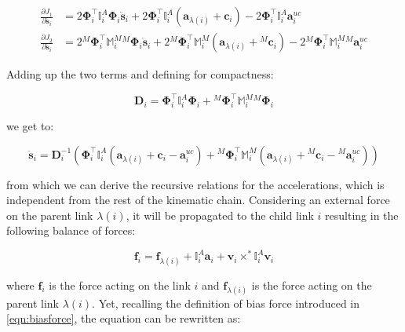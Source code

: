 \begin{align}
    \frac{\partial J _1}{\partial \ddot{\mathbf{s}} _i} & = 2 \boldsymbol{\Phi} ^\top _i \mathbb{I} ^A _i \boldsymbol{\Phi} _i \ddot{\mathbf{s}} _i + 2 \boldsymbol{\Phi} ^\top _i \mathbb{I} ^A _i (\mathbf{a} _{\lambda (i)} + \mathbf{c} _i) - 2 \boldsymbol{\Phi} ^\top _i \mathbb{I} ^A _i \mathbf{a} ^{uc} _i \nonumber                                        \\
    \frac{\partial J _2}{\partial \ddot{\mathbf{s}} _i} & = 2 {} ^M \boldsymbol{\Phi} ^\top _i \mathbb{M} ^M _i {} ^M \boldsymbol{\Phi} _i \ddot{\mathbf{s}} _i + 2 {} ^M  \boldsymbol{\Phi} ^\top _i \mathbb{M} ^M _i (\mathbf{a} _{\lambda (i)} + {} ^M  \mathbf{c} _i) - 2 {} ^M \boldsymbol{\Phi} ^\top _i \mathbb{M} ^M _i {} ^M \mathbf{a} ^{uc} _i  \nonumber
\end{align}

Adding up the two terms and defining for compactness:

\begin{equation}
    \mathbf{D} _i = \boldsymbol{\Phi} ^\top _i \mathbb{I} ^A _i \boldsymbol{\Phi} _i + {} ^M \boldsymbol{\Phi} ^\top _i \mathbb{M} ^M _i {} ^M \boldsymbol{\Phi} _i
\end{equation}

we get to:

\begin{equation}
    \label{eqn:aba_jointacc}
    \ddot{\mathbf{s}} _i = \mathbf{D} _i ^{-1} (\boldsymbol{\Phi} ^\top _i \mathbb{I} ^A _i (\mathbf{a} _{\lambda (i)} + \mathbf{c} _i - \mathbf{a} ^{uc} _i) + {} ^M \boldsymbol{\Phi} ^\top _i \mathbb{M} ^M _i ( \mathbf{a} _{\lambda (i)} + {} ^M \mathbf{c} _i - {} ^M \mathbf{a} ^{uc} _i))
\end{equation}

from which we can derive the recursive relations for the accelerations, which is independent from the rest of the kinematic chain. Considering an external force on the parent link $\lambda (i)$, it will be propagated to the child link $i$ resulting in the following balance of forces:

\begin{equation}
    \mathbf{f} _i = \mathbf{f} _{\lambda (i)} + \mathbb{I} ^A _i \mathbf{a} _i + \mathbf{v} _i \times ^* \mathbb{I} ^A _i \mathbf{v} _i
\end{equation}

where $\mathbf{f} _i$ is the force acting on the link $i$ and $\mathbf{f} _{\lambda (i)}$ is the force acting on the parent link $\lambda (i)$. Yet, recalling the definition of bias force introduced in \cref{eqn:biasforce}, the equation can be rewritten as:

